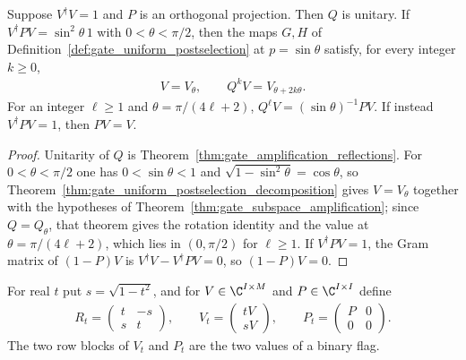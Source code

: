\begin{theorem}
    \label{thm:gate_uniform_postselection_amplification}
    \leanok
    Suppose $V^\dagger V=1$ and $P$ is an orthogonal projection. Then $Q$ is
    unitary. If $V^\dagger PV=\sin^2\theta\,1$ with $0<\theta<\pi/2$, then the
    maps $G,H$ of Definition~\ref{def:gate_uniform_postselection} at
    $p=\sin\theta$ satisfy, for every integer $k\geq0$,
    \begin{align}
        V=V_\theta,\qquad Q^kV=V_{\theta+2k\theta}.
    \end{align}
    For an integer $\ell\geq1$ and $\theta=\pi/(4\ell+2)$,
    $Q^\ell V=(\sin\theta)^{-1}PV$. If instead $V^\dagger PV=1$, then
    $PV=V$.
\end{theorem}
\begin{proof}\leanok
    Unitarity of $Q$ is Theorem~\ref{thm:gate_amplification_reflections}.
    For $0<\theta<\pi/2$ one has $0<\sin\theta<1$ and
    $\sqrt{1-\sin^2\theta}=\cos\theta$, so
    Theorem~\ref{thm:gate_uniform_postselection_decomposition} gives
    $V=V_\theta$ together with the hypotheses of
    Theorem~\ref{thm:gate_subspace_amplification}; since $Q=Q_\theta$, that
    theorem gives the rotation identity and the value at
    $\theta=\pi/(4\ell+2)$, which lies in $(0,\pi/2)$ for $\ell\geq1$. If
    $V^\dagger PV=1$, the Gram matrix of $(1-P)V$ is
    $V^\dagger V-V^\dagger PV=0$, so $(1-P)V=0$.
\end{proof}

\begin{definition}
    \label{def:gate_uniform_success_attenuation}
    \leanok
    For real $t$ put $s=\sqrt{1-t^2}$, and for $V\in\C^{I\times M}$ and
    $P\in\C^{I\times I}$ define
    \begin{align}
        R_t=\begin{pmatrix}t&-s\\s&t\end{pmatrix},
        \qquad V_t=\begin{pmatrix}tV\\sV\end{pmatrix},
        \qquad P_t=\begin{pmatrix}P&0\\0&0\end{pmatrix}.
    \end{align}
    The two row blocks of $V_t$ and $P_t$ are the two values of a binary
    flag.
\end{definition}

